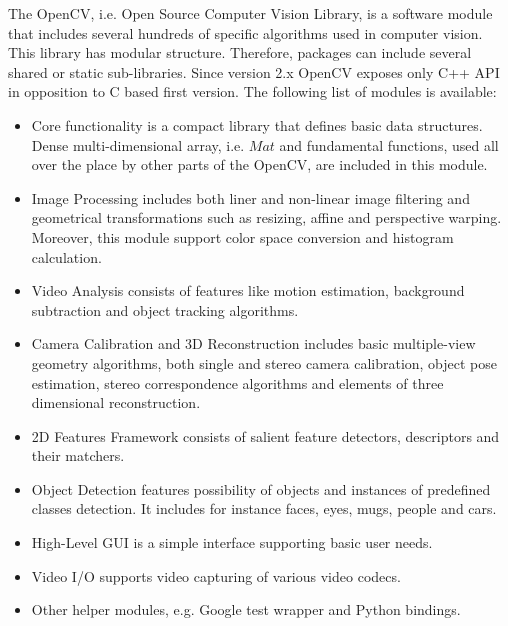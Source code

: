 The OpenCV, i.e. Open Source Computer Vision Library, is a software module that includes
several hundreds of specific algorithms used in computer vision. This library has modular
structure. Therefore, packages can include several shared or static sub-libraries.
Since version 2.x OpenCV exposes only C++ API in opposition to C based first version.
The following list of modules is available:
\begin{itemize}
    \item Core functionality is a compact library that defines basic data structures. Dense
    multi-dimensional array, i.e. $Mat$ and fundamental functions, used all over the place
    by other parts of the OpenCV, are included in this module.
    \item Image Processing includes both liner and non-linear image filtering and geometrical
    transformations such as resizing, affine and perspective warping. Moreover, this module
    support color space conversion and histogram calculation. 
    \item Video Analysis consists of features like motion estimation, background
    subtraction and object tracking algorithms.
    \item Camera Calibration and 3D Reconstruction includes basic multiple-view geometry
    algorithms, both single and stereo camera calibration, object pose estimation, stereo
    correspondence algorithms and elements of three dimensional reconstruction.
    \item 2D Features Framework consists of salient feature detectors, descriptors and their matchers. 
    \item Object Detection features possibility of objects and instances of predefined classes detection.
    It includes for instance faces, eyes, mugs, people and cars. 
    \item High-Level GUI is a simple interface supporting basic user needs.
    \item Video I/O supports video capturing of various video codecs.
    \item Other helper modules, e.g. Google test wrapper and Python bindings.
\end{itemize}

